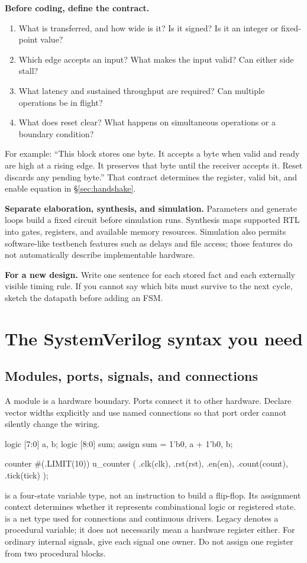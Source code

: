 \documentclass[11pt]{article}
\newcommand{\cd}[1]{{\frenchspacing\texttt{\detokenize{#1}}}}
\newcommand{\transfer}[1]{\par\textbf{For a new design.} #1\par}
\newcommand{\sect}[1]{\hyperref[sec:#1]{\S\ref*{sec:#1}}}
\begin{document}
\textbf{Before coding, define the contract.}
\begin{enumerate}
\item What is transferred, and how wide is it? Is it signed? Is it an integer or fixed-point value?
\item Which edge accepts an input? What makes the input valid? Can either side stall?
\item What latency and sustained throughput are required? Can multiple operations be in flight?
\item What does reset clear? What happens on simultaneous operations or a boundary condition?
\end{enumerate}
For example: ``This block stores one byte. It accepts a byte when valid and ready are high at a rising edge.
It preserves that byte until the receiver accepts it. Reset discards any pending byte.''
That contract determines the register, valid bit, and enable equation in \sect{handshake}.

\textbf{Separate elaboration, synthesis, and simulation.}
Parameters and generate loops build a fixed circuit before simulation runs.
Synthesis maps supported RTL into gates, registers, and available memory resources.
Simulation also permits software-like testbench features such as delays and file access; those features do not automatically describe implementable hardware.
\transfer{Write one sentence for each stored fact and each externally visible timing rule.
If you cannot say which bits must survive to the next cycle, sketch the datapath before adding an FSM.}

\section{The SystemVerilog syntax you need}\label{sec:syntax}
\subsection{Modules, ports, signals, and connections}
A module is a hardware boundary. Ports connect it to other hardware.
Declare vector widths explicitly and use named connections so that port order cannot silently change the wiring.
\par\noindent\begin{minipage}{\linewidth}
\begin{svcode}
logic [7:0] a, b;
logic [8:0] sum;
assign sum = {1'b0, a} + {1'b0, b};

counter #(.LIMIT(10)) u_counter (
    .clk(clk), .rst(rst), .en(en), .count(count), .tick(tick)
);
\end{svcode}
\end{minipage}\par
\cd{logic} is a four-state variable type, not an instruction to build a flip-flop.
Its assignment context determines whether it represents combinational logic or registered state.
\cd{wire} is a net type used for connections and continuous drivers. Legacy \cd{reg} denotes a procedural variable; it does not necessarily mean a hardware register either.
For ordinary internal signals, give each signal one owner. Do not assign one register from two procedural blocks.
\end{document}
